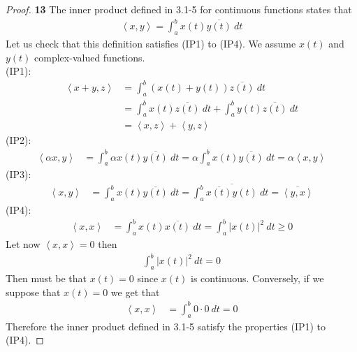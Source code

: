 \documentclass[11pt]{article}
\newcommand{\inprd}[1]{\left\langle{#1}\right\rangle}
\theoremstyle{definition}
\begin{document}
\cleardoublepage
\begin{proof}{\textbf{13}}
The inner product defined in 3.1-5 for continuous functions states that
\begin{align*}
    \inprd{x,y} = \int_a^b x(t)\overline{y(t)}~dt
\end{align*}
Let us check that this definition satisfies (IP1) to (IP4).
We assume $x(t)$ and $y(t)$ complex-valued functions.\\
(IP1):
\begin{align*}
    \inprd{x + y,z} &= \int_a^b (x(t) + y(t))\overline{z(t)}~dt\\
    &= \int_a^b x(t)\overline{z(t)}~dt + \int_a^b y(t)\overline{z(t)}~dt\\
    &= \inprd{x, z} + \inprd{y, z}
\end{align*}
(IP2):
\begin{align*}
    \inprd{\alpha x,y} &= \int_a^b \alpha x(t)\overline{y(t)}~dt
    = \alpha\int_a^b x(t)\overline{y(t)}~dt
    = \alpha\inprd{x, y}
\end{align*}
(IP3):
\begin{align*}
    \inprd{x,y} &= \int_a^b x(t)\overline{y(t)}~dt
    = \int_a^b \overline{\overline{x(t)}y(t)}~dt
    = \overline{\inprd{y,x}}
\end{align*}
(IP4):
\begin{align*}
    \inprd{x, x} &= \int_a^b x(t)\overline{x(t)}~dt
    = \int_a^b |x(t)|^2~dt \geq 0
\end{align*}
Let now $\inprd{x, x} = 0$ then 
\begin{align*}
    \int_a^b |x(t)|^2~dt = 0
\end{align*}
Then must be that $x(t) = 0$ since $x(t)$ is continuous.
Conversely, if we suppose that $x(t) = 0$ we get that
\begin{align*}
    \inprd{x, x} &= \int_a^b 0\cdot 0~dt = 0
\end{align*}
Therefore the inner product defined in 3.1-5 satisfy the properties (IP1) to
(IP4).
\end{proof}

\cleardoublepage
\end{document}
